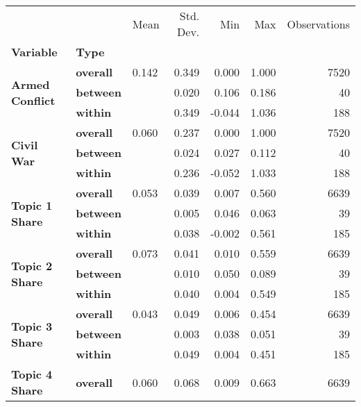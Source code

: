 \begin{longtable}{lllrrrr}

\toprule
               &        &  Mean &  Std. Dev. &    Min &   Max &  Observations \\
\textbf{Variable} & \textbf{Type} &       &            &        &       &               \\
\midrule
\multirow{3}{*}{\textbf{Armed Conflict}} & \textbf{overall} & 0.142 &      0.349 &  0.000 & 1.000 &          7520 \\
               & \textbf{between} &       &      0.020 &  0.106 & 0.186 &            40 \\
               & \textbf{within} &       &      0.349 & -0.044 & 1.036 &           188 \\
\cline{1-7}
\multirow{3}{*}{\textbf{Civil War}} & \textbf{overall} & 0.060 &      0.237 &  0.000 & 1.000 &          7520 \\
               & \textbf{between} &       &      0.024 &  0.027 & 0.112 &            40 \\
               & \textbf{within} &       &      0.236 & -0.052 & 1.033 &           188 \\
\cline{1-7}
\multirow{3}{*}{\textbf{Topic 1 Share}} & \textbf{overall} & 0.053 &      0.039 &  0.007 & 0.560 &          6639 \\
               & \textbf{between} &       &      0.005 &  0.046 & 0.063 &            39 \\
               & \textbf{within} &       &      0.038 & -0.002 & 0.561 &           185 \\
\cline{1-7}
\multirow{3}{*}{\textbf{Topic 2 Share}} & \textbf{overall} & 0.073 &      0.041 &  0.010 & 0.559 &          6639 \\
               & \textbf{between} &       &      0.010 &  0.050 & 0.089 &            39 \\
               & \textbf{within} &       &      0.040 &  0.004 & 0.549 &           185 \\
\cline{1-7}
\multirow{3}{*}{\textbf{Topic 3 Share}} & \textbf{overall} & 0.043 &      0.049 &  0.006 & 0.454 &          6639 \\
               & \textbf{between} &       &      0.003 &  0.038 & 0.051 &            39 \\
               & \textbf{within} &       &      0.049 &  0.004 & 0.451 &           185 \\
\cline{1-7}
\multirow{3}{*}{\textbf{Topic 4 Share}} & \textbf{overall} & 0.060 &      0.068 &  0.009 & 0.663 &          6639 \\

\end{longtable}
